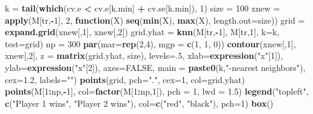\documentclass[]{article}
\newenvironment{Shaded}{\begin{snugshade}}{\end{snugshade}}
\newcommand{\KeywordTok}[1]{\textcolor[rgb]{0.13,0.29,0.53}{\textbf{#1}}}
\newcommand{\DataTypeTok}[1]{\textcolor[rgb]{0.13,0.29,0.53}{#1}}
\newcommand{\DecValTok}[1]{\textcolor[rgb]{0.00,0.00,0.81}{#1}}
\newcommand{\FloatTok}[1]{\textcolor[rgb]{0.00,0.00,0.81}{#1}}
\newcommand{\StringTok}[1]{\textcolor[rgb]{0.31,0.60,0.02}{#1}}
\newcommand{\OtherTok}[1]{\textcolor[rgb]{0.56,0.35,0.01}{#1}}
\newcommand{\ControlFlowTok}[1]{\textcolor[rgb]{0.13,0.29,0.53}{\textbf{#1}}}
\newcommand{\OperatorTok}[1]{\textcolor[rgb]{0.81,0.36,0.00}{\textbf{#1}}}
\newcommand{\NormalTok}[1]{#1}
\begin{document}
\begin{Shaded}
\begin{Highlighting}[]
\NormalTok{k =}\StringTok{ }\KeywordTok{tail}\NormalTok{(}\KeywordTok{which}\NormalTok{(cv.e }\OperatorTok{<}\StringTok{ }\NormalTok{cv.e[k.min] }\OperatorTok{+}\StringTok{ }\NormalTok{cv.se[k.min]), }\DecValTok{1}\NormalTok{)}
\NormalTok{size =}\StringTok{ }\DecValTok{100}
\NormalTok{xnew =}\StringTok{ }\KeywordTok{apply}\NormalTok{(M[tr,}\OperatorTok{-}\DecValTok{1}\NormalTok{], }\DecValTok{2}\NormalTok{, }\ControlFlowTok{function}\NormalTok{(X) }\KeywordTok{seq}\NormalTok{(}\KeywordTok{min}\NormalTok{(X), }\KeywordTok{max}\NormalTok{(X), }\DataTypeTok{length.out=}\NormalTok{size))}
\NormalTok{grid =}\StringTok{ }\KeywordTok{expand.grid}\NormalTok{(xnew[,}\DecValTok{1}\NormalTok{], xnew[,}\DecValTok{2}\NormalTok{])}
\NormalTok{grid.yhat =}\StringTok{ }\KeywordTok{knn}\NormalTok{(M[tr,}\OperatorTok{-}\DecValTok{1}\NormalTok{], M[tr,}\DecValTok{1}\NormalTok{], }\DataTypeTok{k=}\NormalTok{k, }\DataTypeTok{test=}\NormalTok{grid)}
\NormalTok{np =}\StringTok{ }\DecValTok{300}
\KeywordTok{par}\NormalTok{(}\DataTypeTok{mar=}\KeywordTok{rep}\NormalTok{(}\DecValTok{2}\NormalTok{,}\DecValTok{4}\NormalTok{), }\DataTypeTok{mgp =} \KeywordTok{c}\NormalTok{(}\DecValTok{1}\NormalTok{, }\DecValTok{1}\NormalTok{, }\DecValTok{0}\NormalTok{))}
\KeywordTok{contour}\NormalTok{(xnew[,}\DecValTok{1}\NormalTok{], xnew[,}\DecValTok{2}\NormalTok{], }\DataTypeTok{z =} \KeywordTok{matrix}\NormalTok{(grid.yhat, size), }\DataTypeTok{levels=}\NormalTok{.}\DecValTok{5}\NormalTok{, }
        \DataTypeTok{xlab=}\KeywordTok{expression}\NormalTok{(}\StringTok{"x"}\NormalTok{[}\DecValTok{1}\NormalTok{]), }\DataTypeTok{ylab=}\KeywordTok{expression}\NormalTok{(}\StringTok{"x"}\NormalTok{[}\DecValTok{2}\NormalTok{]), }\DataTypeTok{axes=}\OtherTok{FALSE}\NormalTok{,}
        \DataTypeTok{main =} \KeywordTok{paste0}\NormalTok{(k,}\StringTok{"-nearest neighbors"}\NormalTok{), }\DataTypeTok{cex=}\FloatTok{1.2}\NormalTok{, }\DataTypeTok{labels=}\StringTok{""}\NormalTok{)}
\KeywordTok{points}\NormalTok{(grid, }\DataTypeTok{pch=}\StringTok{"."}\NormalTok{, }\DataTypeTok{cex=}\DecValTok{1}\NormalTok{, }\DataTypeTok{col=}\NormalTok{grid.yhat)}
\KeywordTok{points}\NormalTok{(M[}\DecValTok{1}\OperatorTok{:}\NormalTok{np,}\OperatorTok{-}\DecValTok{1}\NormalTok{], }\DataTypeTok{col=}\KeywordTok{factor}\NormalTok{(M[}\DecValTok{1}\OperatorTok{:}\NormalTok{np,}\DecValTok{1}\NormalTok{]), }\DataTypeTok{pch =} \DecValTok{1}\NormalTok{, }\DataTypeTok{lwd =} \FloatTok{1.5}\NormalTok{)}
\KeywordTok{legend}\NormalTok{(}\StringTok{"topleft"}\NormalTok{, }\KeywordTok{c}\NormalTok{(}\StringTok{"Player 1 wins"}\NormalTok{, }\StringTok{"Player 2 wins"}\NormalTok{), }
       \DataTypeTok{col=}\KeywordTok{c}\NormalTok{(}\StringTok{"red"}\NormalTok{, }\StringTok{"black"}\NormalTok{), }\DataTypeTok{pch=}\DecValTok{1}\NormalTok{)}
\KeywordTok{box}\NormalTok{()}
\end{Highlighting}
\end{Shaded}
\end{document}
